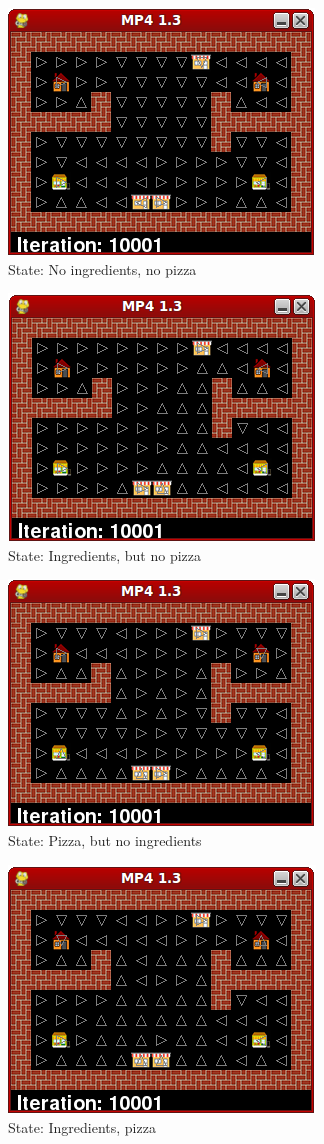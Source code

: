 \begin{figure}[H]
  \centering
  \includegraphics[width=0.4\linewidth]{graphics/state0_13ec.png}
  \caption{State: No ingredients, no pizza}
\end{figure}

\begin{figure}[H]
  \centering
  \includegraphics[width=0.4\linewidth]{graphics/state1_13ec.png}
  \caption{State: Ingredients, but no pizza}
\end{figure}

\begin{figure}[H]
  \centering
  \includegraphics[width=0.4\linewidth]{graphics/state2_13ec.png}
  \caption{State: Pizza, but no ingredients}
\end{figure}

\begin{figure}[H]
  \centering
  \includegraphics[width=0.4\linewidth]{graphics/state3_13ec.png}
  \caption{State: Ingredients, pizza}
\end{figure}

